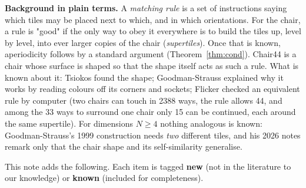 \documentclass[11pt,a4paper]{article}
\theoremstyle{plain}
\theoremstyle{definition}
\begin{document}
\textbf{Background in plain terms.} A \emph{matching rule} is a set of instructions saying which tiles may be placed next to which, and in which orientations. For the chair, a rule is "good" if the only way to obey it everywhere is to build the tiles up, level by level, into ever larger copies of the chair (\emph{supertiles}). Once that is known, aperiodicity follows by a standard argument (Theorem~\ref{thm:cond}). Chair44 is a chair whose surface is shaped so that the shape itself acts as such a rule. What is known about it: Tsiokos \cite{tsiokos} found the shape; Goodman-Strauss \cite{gs2026} explained why it works by reading colours off its corners and sockets; Flicker \cite{flicker} checked an equivalent rule by computer (two chairs can touch in 2388 ways, the rule allows 44, and among the 33 ways to surround one chair only 15 can be continued, each around the same supertile). For dimensions $N \ge  4$ nothing analogous is known: Goodman-Strauss's 1999 construction \cite{gs99} needs \emph{two} different tiles, and his 2026 notes remark only that the chair shape and its self-similarity generalise.

This note adds the following. Each item is tagged \textbf{new} (not in the literature to our knowledge) or \textbf{known} (included for completeness).
\end{document}
